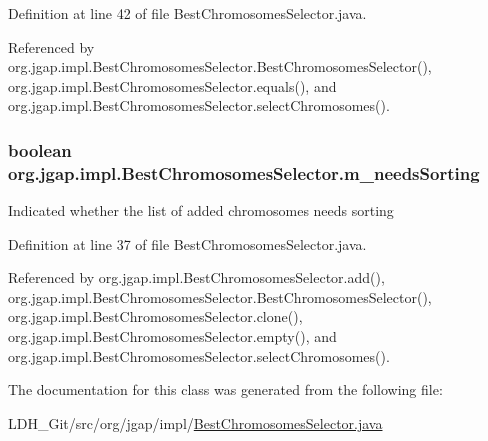 Definition at line 42 of file Best\-Chromosomes\-Selector.\-java.



Referenced by org.\-jgap.\-impl.\-Best\-Chromosomes\-Selector.\-Best\-Chromosomes\-Selector(), org.\-jgap.\-impl.\-Best\-Chromosomes\-Selector.\-equals(), and org.\-jgap.\-impl.\-Best\-Chromosomes\-Selector.\-select\-Chromosomes().

\hypertarget{classorg_1_1jgap_1_1impl_1_1_best_chromosomes_selector_a81d9b14ee7e7e116fbd1c71ec41ba059}{
\subsubsection[{m\-\_\-needs\-Sorting}]{\setlength{\rightskip}{0pt plus 5cm}boolean org.\-jgap.\-impl.\-Best\-Chromosomes\-Selector.\-m\-\_\-needs\-Sorting\hspace{0.3cm}{\ttfamily [private]}}}\label{classorg_1_1jgap_1_1impl_1_1_best_chromosomes_selector_a81d9b14ee7e7e116fbd1c71ec41ba059}
Indicated whether the list of added chromosomes needs sorting 

Definition at line 37 of file Best\-Chromosomes\-Selector.\-java.



Referenced by org.\-jgap.\-impl.\-Best\-Chromosomes\-Selector.\-add(), org.\-jgap.\-impl.\-Best\-Chromosomes\-Selector.\-Best\-Chromosomes\-Selector(), org.\-jgap.\-impl.\-Best\-Chromosomes\-Selector.\-clone(), org.\-jgap.\-impl.\-Best\-Chromosomes\-Selector.\-empty(), and org.\-jgap.\-impl.\-Best\-Chromosomes\-Selector.\-select\-Chromosomes().



The documentation for this class was generated from the following file\-:\begin{DoxyCompactItemize}
\item 
L\-D\-H\-\_\-\-Git/src/org/jgap/impl/\hyperlink{_best_chromosomes_selector_8java}{Best\-Chromosomes\-Selector.\-java}\end{DoxyCompactItemize}
